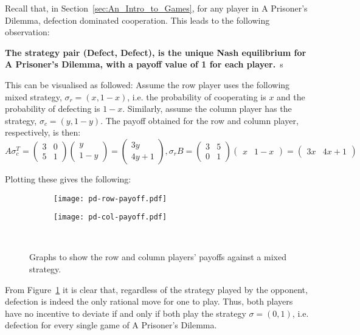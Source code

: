 Recall that, in Section~\ref{sec:An_Intro_to_Games}, for any player in A
Prisoner's Dilemma, defection dominated cooperation. This leads to the following
observation:
\begin{center}
    \textbf{The strategy pair (Defect, Defect), is the unique Nash equilibrium for A Prisoner's Dilemma, with a payoff value of 1 for each player.}~s\cite{maschler_solan_zamir_2013}
\end{center}
This can be visualised as followed:
Assume the row player uses the following mixed strategy, \(\sigma_{r} = (x,
1-x)\), i.e. the probability of cooperating is \(x\) and the probability of
defecting is \(1-x\). Similarly, assume the column player has 
the strategy, \(\sigma_{c} = (y, 1-y)\). The payoff obtained for the row and column player, respectively, is then:
\[
    A\sigma_{c}^T = \begin{pmatrix}
        3 & 0 \\
        5 & 1
    \end{pmatrix} \begin{pmatrix}
        y \\
        1-y
    \end{pmatrix} = \begin{pmatrix}
        3y \\
        4y + 1
    \end{pmatrix},

    \sigma_{r}B = \begin{pmatrix}
        3 & 5 \\
        0 & 1        
    \end{pmatrix} \begin{pmatrix}
        x & 1-x
    \end{pmatrix} = \begin{pmatrix}
        3x & 4x + 1
    \end{pmatrix}
\]

Plotting these gives the following:
\begin{figure}[h]
    \centering
        \begin{subfigure}[t]{0.45\textwidth}
        \centering
            \texttt{[image: pd-row-payoff.pdf]}
        \end{subfigure}
    \hfill
        \begin{subfigure}[t]{0.45\textwidth}
        \centering
            \texttt{[image: pd-col-payoff.pdf]}
        \end{subfigure}~\caption{Graphs to show the row and column players' payoffs against a mixed strategy.}
    \label{fig:mixed_strategy_PD}
    \end{figure}
From Figure~\ref{fig:mixed_strategy_PD} it is clear that, regardless of the
strategy played by the opponent, defection is indeed the only rational move for
one to play. Thus, both players have no incentive to deviate if and only if both
play the strategy \(\sigma=(0, 1)\), i.e. defection for every single game of A
Prisoner's Dilemma.

